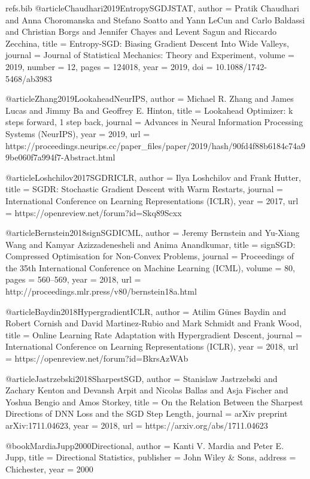 \begin{filecontents*}{refs.bib}
@article{Chaudhari2019EntropySGDJSTAT,
  author = {Pratik Chaudhari and Anna Choromanska and Stefano Soatto and Yann LeCun and Carlo Baldassi and Christian Borgs and Jennifer Chayes and Levent Sagun and Riccardo Zecchina},
  title = {Entropy-SGD: Biasing Gradient Descent Into Wide Valleys},
  journal = {Journal of Statistical Mechanics: Theory and Experiment},
  volume = {2019},
  number = {12},
  pages = {124018},
  year = {2019},
  doi = {10.1088/1742-5468/ab3983}
}

@article{Zhang2019LookaheadNeurIPS,
  author = {Michael R. Zhang and James Lucas and Jimmy Ba and Geoffrey E. Hinton},
  title = {Lookahead Optimizer: k steps forward, 1 step back},
  journal = {Advances in Neural Information Processing Systems (NeurIPS)},
  year = {2019},
  url = {https://proceedings.neurips.cc/paper_files/paper/2019/hash/90fd4f88b6184c74a99be060f7a994f7-Abstract.html}
}

@article{Loshchilov2017SGDRICLR,
  author = {Ilya Loshchilov and Frank Hutter},
  title = {SGDR: Stochastic Gradient Descent with Warm Restarts},
  journal = {International Conference on Learning Representations (ICLR)},
  year = {2017},
  url = {https://openreview.net/forum?id=Skq89Scxx}
}

@article{Bernstein2018signSGDICML,
  author = {Jeremy Bernstein and Yu-Xiang Wang and Kamyar Azizzadenesheli and Anima Anandkumar},
  title = {signSGD: Compressed Optimisation for Non-Convex Problems},
  journal = {Proceedings of the 35th International Conference on Machine Learning (ICML)},
  volume = {80},
  pages = {560--569},
  year = {2018},
  url = {http://proceedings.mlr.press/v80/bernstein18a.html}
}

@article{Baydin2018HypergradientICLR,
  author = {Atilim Günes Baydin and Robert Cornish and David Martinez-Rubio and Mark Schmidt and Frank Wood},
  title = {Online Learning Rate Adaptation with Hypergradient Descent},
  journal = {International Conference on Learning Representations (ICLR)},
  year = {2018},
  url = {https://openreview.net/forum?id=BkrsAzWAb}
}

@article{Jastrzebski2018SharpestSGD,
  author = {Stanislaw Jastrzebski and Zachary Kenton and Devansh Arpit and Nicolas Ballas and Asja Fischer and Yoshua Bengio and Amos Storkey},
  title = {On the Relation Between the Sharpest Directions of DNN Loss and the SGD Step Length},
  journal = {arXiv preprint arXiv:1711.04623},
  year = {2018},
  url = {https://arxiv.org/abs/1711.04623}
}

@book{MardiaJupp2000Directional,
  author = {Kanti V. Mardia and Peter E. Jupp},
  title = {Directional Statistics},
  publisher = {John Wiley \& Sons},
  address = {Chichester},
  year = {2000}
}


\end{filecontents*}
